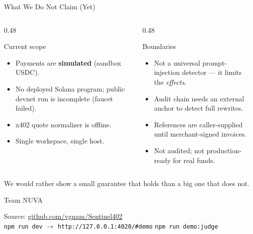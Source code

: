 \documentclass{beamer}
\newcommand{\hrefcol}[2]{\textcolor{maincolor}{\href{#1}{#2}}}
\begin{document}
\begin{frame}{What We Do Not Claim (Yet)}
\small
\begin{columns}[T,onlytextwidth]
  \begin{column}{0.48\textwidth}
    \begin{block}{Current scope}
      \footnotesize
      \begin{itemize}
        \item Payments are \textbf{simulated} (sandbox USDC).
        \item No deployed Solana program; public devnet run is incomplete
              (faucet failed).
        \item x402 quote normalizer is offline.
        \item Single workspace, single host.
      \end{itemize}
    \end{block}
  \end{column}
  \begin{column}{0.48\textwidth}
    \begin{block}{Boundaries}
      \footnotesize
      \begin{itemize}
        \item Not a universal prompt-injection detector --- it limits the
              \emph{effects}.
        \item Audit chain needs an external anchor to detect full rewrites.
        \item References are caller-supplied until merchant-signed invoices.
        \item Not audited; not production-ready for real funds.
      \end{itemize}
    \end{block}
  \end{column}
\end{columns}

\vspace{4mm}
\centering\footnotesize
We would rather show a small guarantee that holds than a big one that does not.
\end{frame}

\begin{frame}{Team NUVA}
\begin{center}
\end{center}

\vspace{4mm}
\begin{center}
\small
Source: \hrefcol{https://github.com/vgnam/Sentinel402}{github.com/vgnam/Sentinel402}\\[2mm]
\footnotesize
\texttt{npm run dev} \(\rightarrow\) \texttt{http://127.0.0.1:4020/\#demo}
\quad\textbullet\quad \texttt{npm run demo:judge}
\end{center}
\end{frame}
\end{document}
